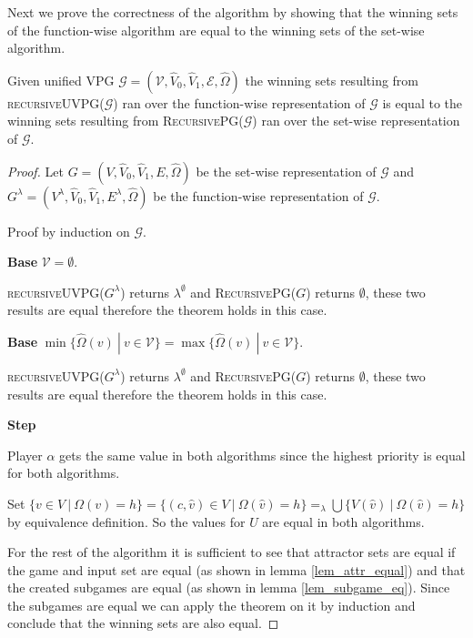 Next we prove the correctness of the algorithm by showing that the winning sets of the function-wise algorithm are equal to the winning sets of the set-wise algorithm.
\begin{theorem}
	Given unified VPG $\mathcal{G} = (\mathcal{V},\hat{V}_0,\hat{V}_1, \mathcal{E}, \hat{\Omega})$ the winning sets resulting from \textsc{recursiveUVPG($\mathcal{G}$)} ran over the function-wise representation of $\mathcal{G}$ is equal to the winning sets resulting from \textsc{RecursivePG($\mathcal{G}$)} ran over the set-wise representation of $\mathcal{G}$.
	\begin{proof}
		Let $G = (V,\hat{V}_0,\hat{V}_1,E,\hat{\Omega})$ be the set-wise representation of $\mathcal{G}$ and $G^\lambda = (V^\lambda, \hat{V}_0, \hat{V}_1, E^\lambda, \hat{\Omega})$ be the function-wise representation of $\mathcal{G}$.
		
		Proof by induction on $\mathcal{G}$.
		
		\textbf{Base} $\mathcal{V} = \emptyset$. 
		
		\textsc{recursiveUVPG($G^\lambda$)} returns $\lambda^\emptyset$ and \textsc{RecursivePG($G$)} returns $\emptyset$, these two results are equal therefore the theorem holds in this case.
		
		\textbf{Base} $\min\{\hat{\Omega}(v)\ |\ v \in \mathcal{V}\} = \max\{\hat{\Omega}(v)\ |\ v \in \mathcal{V}\}$.
		
		\textsc{recursiveUVPG($G^\lambda$)} returns $\lambda^\emptyset$ and \textsc{RecursivePG($G$)} returns $\emptyset$, these two results are equal therefore the theorem holds in this case.
		
		\textbf{Step}
		
		Player $\alpha$ gets the same value in both algorithms since the highest priority is equal for both algorithms.
		
		Set $\{v \in V\ |\ \Omega(v) = h\} = \{(c,\hat{v}) \in V\ |\ \Omega(\hat{v}) = h \} =_\lambda  \bigcup\{V(\hat{v})\ |\ \Omega(\hat{v}) = h \}$ by equivalence definition. So the values for $U$ are equal in both algorithms.
		
		For the rest of the algorithm it is sufficient to see that attractor sets are equal if the game and input set are equal (as shown in lemma \ref{lem_attr_equal}) and that the created subgames are equal (as shown in lemma \ref{lem_subgame_eq}). Since the subgames are equal we can apply the theorem on it by induction and conclude that the winning sets are also equal.
	\end{proof}
\end{theorem}

